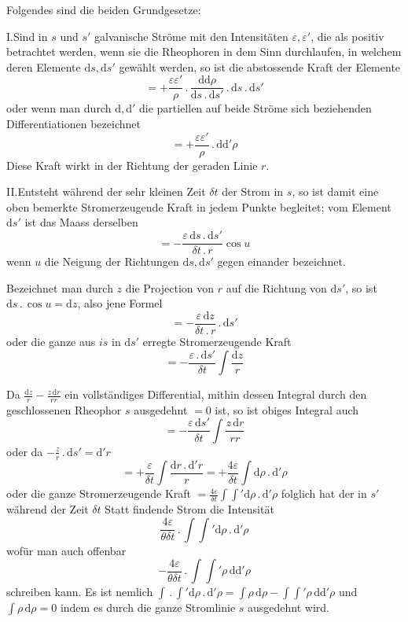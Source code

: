 Folgendes sind die beiden Grundgesetze:

I.\quad Sind in $s$ und $s'$ galvanische Ströme mit den Intensitäten $\varepsilon,\varepsilon'$, die als positiv betrachtet werden, wenn sie die Rheophoren in dem Sinn durchlaufen, in welchem deren Elemente $\mathrm ds,\mathrm ds'$ gewählt werden, so ist die abstossende Kraft der Elemente
\[
=+\frac{\varepsilon\varepsilon'}{\rho}\,.\,\frac{\mathrm d\mathrm d\rho}{\mathrm ds\,.\,\mathrm ds'}\,.\,\mathrm ds\,.\,\mathrm ds'
\]
oder wenn man durch $\mathrm d,\mathrm d'$ die partiellen auf beide Ströme sich beziehenden Differentiationen bezeichnet
\[
=+\frac{\varepsilon\varepsilon'}{\rho}\,.\,\mathrm d\mathrm d'\rho
\]
Diese Kraft wirkt in der Richtung der geraden Linie $r$.

\vspace{3mm}
II.\quad Entsteht während der sehr kleinen Zeit $\delta t$ der Strom in $s$, so ist damit eine oben bemerkte Stromerzeugende Kraft in jedem Punkte begleitet; vom Element $\mathrm ds'$ ist das Maass derselben
\[
=-\frac{\varepsilon\,\mathrm ds\,.\,\mathrm ds'}{\delta t\,.\,r}\cos u
\]
wenn $u$ die Neigung der Richtungen $\mathrm ds,\mathrm ds'$ gegen einander bezeichnet.

Bezeichnet man durch $z$ die Projection von $r$ auf die Richtung von $\mathrm ds'$, so ist $\mathrm ds\,.\,\cos u=\mathrm dz$, also jene Formel
\[
=-\frac{\varepsilon\,\mathrm dz}{\delta t\,.\,r}\,.\,\mathrm ds'
\]
oder die ganze aus $is$ in $\mathrm ds'$ erregte Stromerzeugende Kraft
\[
=-\frac{\varepsilon\,.\,\mathrm ds'}{\delta t}\int\frac{\mathrm dz}{r}
\]

Da $\frac{\mathrm dz}{r}-\frac{z\,\mathrm dr}{rr}$ ein vollständiges Differential, mithin dessen Integral durch den geschlossenen Rheophor $s$ ausgedehnt $=0$ ist, so ist obiges Integral auch
\[
=-\frac{\varepsilon\,\mathrm ds'}{\delta t}\int\frac{z\,\mathrm dr}{rr}
\]
oder da $-\frac{z}{r}\,.\,\mathrm ds'=\mathrm d'r$
\[
=+\frac{\varepsilon}{\delta t}\int\frac{\mathrm dr\,.\,\mathrm d'r}{r}=+\frac{4\varepsilon}{\delta t}\int\mathrm d\rho\,.\,\mathrm d'\rho
\]
oder die ganze Stromerzeugende Kraft $=\frac{4\varepsilon}{\delta t}\int\int'\mathrm d\rho\,.\,\mathrm d'\rho$ folglich hat der in $s'$ während der Zeit $\delta t$ Statt findende Strom die Intensität
\[
\frac{4\varepsilon}{\theta\delta t}\,.\,\int\int'\mathrm d\rho\,.\,\mathrm d'\rho
\]
wofür man auch offenbar
\[
-\frac{4\varepsilon}{\theta\delta t}\,.\,\int\int'\rho\,\mathrm d\mathrm d'\rho
\]
schreiben kann. Es ist nemlich $\int\,.\,\int'\mathrm d\rho\,.\,\mathrm d'\rho=\int\rho\,\mathrm d\rho-\int\int'\rho\,\mathrm d\mathrm d'\rho$ und $\int\rho\,\mathrm d\rho=0$ indem es durch die ganze Stromlinie $s$ ausgedehnt wird.


